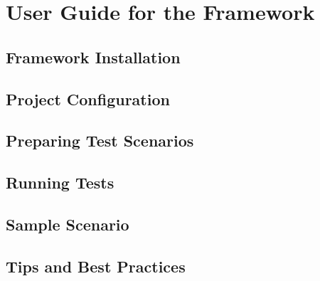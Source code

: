 
\chapter{User Guide for the Framework\label{chap:user_guide}}

\todo{}

\section{Framework Installation}

\todo{}

\section{Project Configuration}

\todo{}

\section{Preparing Test Scenarios}

\todo{}

\section{Running Tests}

\todo{}

\section{Sample Scenario}

\todo{}

\section{Tips and Best Practices}

\todo{}